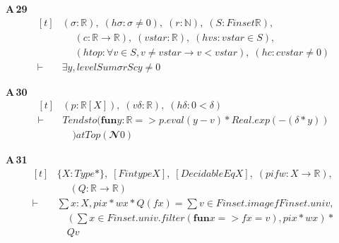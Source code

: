\noindent\textbf{A\,29}\quad{}
{\footnotesize\[ \begin{aligned}[t]
&(\sigma : \mathbb{R} ),\; (\mathit{hσ} : \sigma \neq 0),\; (\mathit{r} : \mathbb{N} ),\; (\mathit{S} : \mathit{Finset} \mathbb{R} ),\\
&\quad \; (\mathit{c} : \mathbb{R} \to \mathbb{R} ),\; (\mathit{vstar} : \mathbb{R} ),\; (\mathit{hvs} : \mathit{vstar} \in \mathit{S}),\\
&\quad \; (\mathit{htop} : \forall \mathit{v} \in \mathit{S}, \mathit{v} \neq \mathit{vstar} \to \mathit{v} < \mathit{vstar}),\; (\mathit{hc} : \mathit{c} \mathit{vstar} \neq 0)\\
\vdash\;&\exists \mathit{y}, \mathit{levelSum} \sigma \mathit{r} \mathit{S} \mathit{c} \mathit{y} \neq 0
\end{aligned} \]}

\noindent\textbf{A\,30}\quad{}
{\footnotesize\[ \begin{aligned}[t]
&(\mathit{p} : \mathbb{R} [\mathit{X}]),\; (\mathit{v} \delta : \mathbb{R} ),\; (\mathit{hδ} : 0 < \delta )\\
\vdash\;&\mathit{Tendsto} (\mathbf{fun} \mathit{y} : \mathbb{R} => \mathit{p}.\mathit{eval} (\mathit{y} - \mathit{v}) * \mathit{Real}.\mathit{exp} (-(\delta * \mathit{y}))\\
&\quad ) \mathit{atTop} (𝓝 0)
\end{aligned} \]}

\noindent\textbf{A\,31}\quad{}
{\footnotesize\[ \begin{aligned}[t]
&\{ \mathit{X} : \mathit{Type}*\},\; [\mathit{Fintype} \mathit{X}],\; [\mathit{DecidableEq} \mathit{X}],\; (\mathit{pi} \mathit{f} \mathit{w} : \mathit{X} \to \mathbb{R} ),\\
&\quad \; (\mathit{Q} : \mathbb{R} \to \mathbb{R} )\\
\vdash\;&\textstyle\sum \mathit{x} : \mathit{X}, \mathit{pi} \mathit{x} * \mathit{w} \mathit{x} * \mathit{Q} (\mathit{f} \mathit{x}) = \textstyle\sum \mathit{v} \in \mathit{Finset}.\mathit{image} \mathit{f} \mathit{Finset}.\mathit{univ},\\
&\quad (\textstyle\sum \mathit{x} \in \mathit{Finset}.\mathit{univ}.\mathit{filter} (\mathbf{fun} \mathit{x} => \mathit{f} \mathit{x} = \mathit{v}), \mathit{pi} \mathit{x} * \mathit{w} \mathit{x}) *\\
&\quad \mathit{Q} \mathit{v}
\end{aligned} \]}

